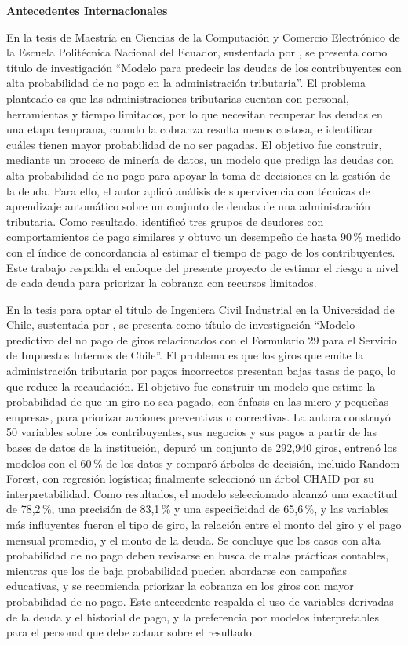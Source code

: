 \documentclass[12pt,a4paper]{report}
\newcommand{\subtitulo}[1]{\par\vspace{4pt}\noindent\textbf{#1}\par}
\begin{document}
\subtitulo{Antecedentes Internacionales}

En la tesis de Maestría en Ciencias de la Computación y Comercio Electrónico de la Escuela Politécnica Nacional del Ecuador, sustentada por \textcite{ordonez2020}, se presenta como título de investigación ``Modelo para predecir las deudas de los contribuyentes con alta probabilidad de no pago en la administración tributaria''. El problema planteado es que las administraciones tributarias cuentan con personal, herramientas y tiempo limitados, por lo que necesitan recuperar las deudas en una etapa temprana, cuando la cobranza resulta menos costosa, e identificar cuáles tienen mayor probabilidad de no ser pagadas. El objetivo fue construir, mediante un proceso de minería de datos, un modelo que prediga las deudas con alta probabilidad de no pago para apoyar la toma de decisiones en la gestión de la deuda. Para ello, el autor aplicó análisis de supervivencia con técnicas de aprendizaje automático sobre un conjunto de deudas de una administración tributaria. Como resultado, identificó tres grupos de deudores con comportamientos de pago similares y obtuvo un desempeño de hasta 90\,\% medido con el índice de concordancia al estimar el tiempo de pago de los contribuyentes. Este trabajo respalda el enfoque del presente proyecto de estimar el riesgo a nivel de cada deuda para priorizar la cobranza con recursos limitados.

En la tesis para optar el título de Ingeniera Civil Industrial en la Universidad de Chile, sustentada por \textcite{cifuentes2016}, se presenta como título de investigación ``Modelo predictivo del no pago de giros relacionados con el Formulario 29 para el Servicio de Impuestos Internos de Chile''. El problema es que los giros que emite la administración tributaria por pagos incorrectos presentan bajas tasas de pago, lo que reduce la recaudación. El objetivo fue construir un modelo que estime la probabilidad de que un giro no sea pagado, con énfasis en las micro y pequeñas empresas, para priorizar acciones preventivas o correctivas. La autora construyó 50 variables sobre los contribuyentes, sus negocios y sus pagos a partir de las bases de datos de la institución, depuró un conjunto de 292,940 giros, entrenó los modelos con el 60\,\% de los datos y comparó árboles de decisión, incluido Random Forest, con regresión logística; finalmente seleccionó un árbol CHAID por su interpretabilidad. Como resultados, el modelo seleccionado alcanzó una exactitud de 78,2\,\%, una precisión de 83,1\,\% y una especificidad de 65,6\,\%, y las variables más influyentes fueron el tipo de giro, la relación entre el monto del giro y el pago mensual promedio, y el monto de la deuda. Se concluye que los casos con alta probabilidad de no pago deben revisarse en busca de malas prácticas contables, mientras que los de baja probabilidad pueden abordarse con campañas educativas, y se recomienda priorizar la cobranza en los giros con mayor probabilidad de no pago. Este antecedente respalda el uso de variables derivadas de la deuda y el historial de pago, y la preferencia por modelos interpretables para el personal que debe actuar sobre el resultado.
\end{document}
